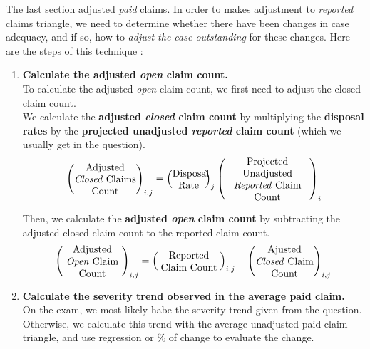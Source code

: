 \documentclass[11pt, english]{memoir}
\numberwithin{definition}{section}
\begin{document}
	The last section adjusted \emph{paid} claims. In order to makes adjustment to \emph{reported} claims triangle, we need to determine whether there have been changes in case adequacy, and if so, how to \emph{adjust the case outstanding} for these changes. Here are the steps of this technique :
	\begin{enumerate}
		\item \textbf{Calculate the adjusted \emph{open} claim count.}\\
		To calculate the adjusted \emph{open} claim count, we first need to adjust the closed claim count. \\
		
		We calculate the \textbf{adjusted \emph{closed} claim count} by multiplying the \textbf{disposal rates} by the \textbf{projected unadjusted \emph{reported} claim count} (which we usually get in the question). 
		\begin{align*}
		\left(\begin{minipage}{0.18\linewidth}\centering
		Adjusted \emph{Closed} Claims Count
		\end{minipage}\right)_{i,j} = 
		\left(\begin{minipage}{0.095\linewidth}\centering
		Disposal Rate
		\end{minipage}\right)_{j}
		\left(\begin{minipage}{0.245\linewidth}\centering
		Projected Unadjusted \emph{Reported} Claim Count
		\end{minipage}\right)_{i}
		\end{align*}

		Then, we calculate the \textbf{adjusted \emph{open} claim count} by subtracting the adjusted closed claim count to the reported claim count. 
		\begin{align*}
		\left(\begin{minipage}{0.17\linewidth}\centering
		Adjusted \emph{Open} Claim Count
		\end{minipage}\right)_{i,j} = 
		\left(\begin{minipage}{0.18\linewidth}\centering
		Reported Claim Count
		\end{minipage}\right)_{i,j} - 
		\left(\begin{minipage}{0.17\linewidth}\centering
		Ajusted \emph{Closed} Claim Count
		\end{minipage}\right)_{i,j}\\
		\end{align*}
		
		
		\item \textbf{Calculate the severity trend observed in the average paid claim.}\\
		On the exam, we most likely habe the severity trend given from the question. Otherwise, we calculate this trend with the average unadjusted paid claim triangle, and use regression or \% of change to evaluate the change.\\
		

\end{enumerate}
\end{document}
